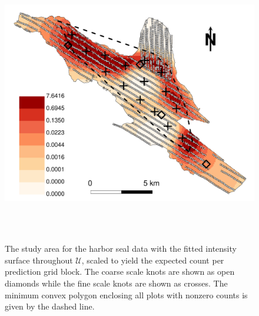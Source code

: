 \documentclass[12pt, titlepage]{article}\usepackage[]{graphicx}\usepackage[]{color}
\def\cU{\mathcal{U}}
\begin{document}
	\begin{figure}[H]
	\begin{center}
	\includegraphics[height=350pt]{figure/RealExampleIntSurfFit}
	\end{center}
	\caption{The study area for the harbor seal data with the fitted intensity surface throughout $\cU$, scaled to yield the expected count per prediction grid block. The coarse scale knots are shown as open diamonds while the fine scale knots are shown as crosses. The minimum convex polygon enclosing all plots with nonzero counts is given by the dashed line. \label{RealDataFittedSurface}}
	\end{figure}

\end{document}
